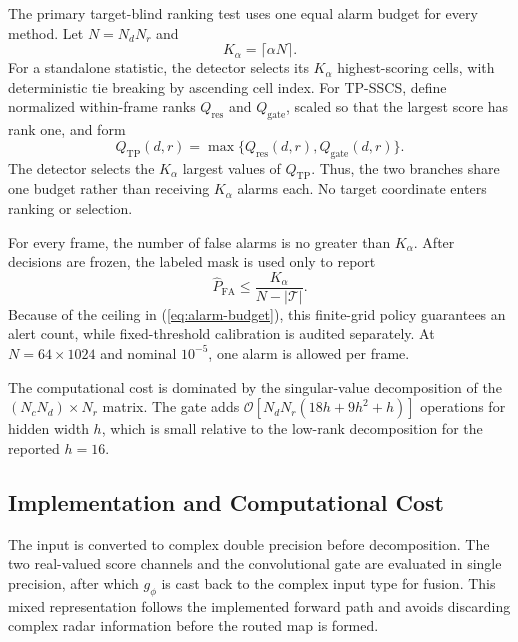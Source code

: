 \documentclass[journal]{IEEEtran}
\begin{document}
The primary target-blind ranking test uses one equal alarm budget for every method. Let $N=N_dN_r$ and
\begin{equation}
    K_{\alpha}=\lceil \alpha N\rceil .
    \label{eq:alarm-budget}
\end{equation}
For a standalone statistic, the detector selects its $K_{\alpha}$ highest-scoring cells, with deterministic tie breaking by ascending cell index. For TP-SSCS, define normalized within-frame ranks $Q_{\mathrm{res}}$ and $Q_{\mathrm{gate}}$, scaled so that the largest score has rank one, and form
\begin{equation}
    Q_{\mathrm{TP}}(d,r)=
    \max\{Q_{\mathrm{res}}(d,r),Q_{\mathrm{gate}}(d,r)\}.
\end{equation}
The detector selects the $K_{\alpha}$ largest values of $Q_{\mathrm{TP}}$. Thus, the two branches share one budget rather than receiving $K_{\alpha}$ alarms each. No target coordinate enters ranking or selection.

For every frame, the number of false alarms is no greater than $K_{\alpha}$. After decisions are frozen, the labeled mask is used only to report
\begin{equation}
    \widehat P_{\mathrm{FA}}
    \leq \frac{K_{\alpha}}{N-|\mathcal{T}|}.
\end{equation}
Because of the ceiling in (\ref{eq:alarm-budget}), this finite-grid policy guarantees an alert count, while fixed-threshold calibration is audited separately. At $N=64\times1024$ and nominal $10^{-5}$, one alarm is allowed per frame.

The computational cost is dominated by the singular-value decomposition of the $(N_cN_d)\times N_r$ matrix. The gate adds $\mathcal{O}[N_dN_r(18h+9h^2+h)]$ operations for hidden width $h$, which is small relative to the low-rank decomposition for the reported $h=16$.

\subsection{Implementation and Computational Cost}

The input is converted to complex double precision before decomposition. The two real-valued score channels and the convolutional gate are evaluated in single precision, after which $g_{\phi}$ is cast back to the complex input type for fusion. This mixed representation follows the implemented forward path and avoids discarding complex radar information before the routed map is formed.
\end{document}
